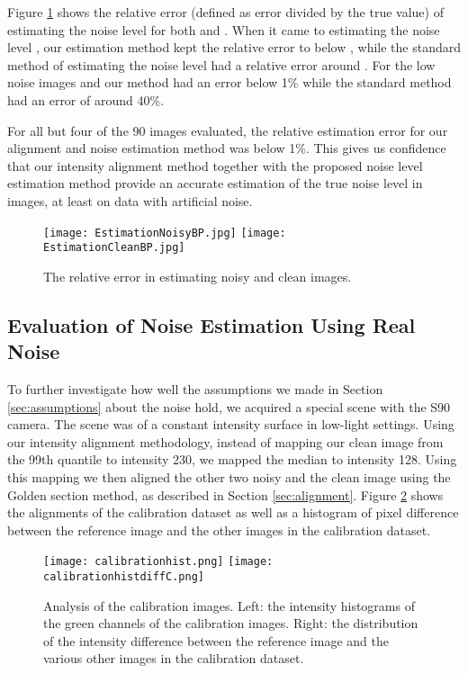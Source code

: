 \documentclass[review]{elsarticle}
\begin{document}
Figure \ref{fig:errorbp} shows the relative error (defined as error divided by the true value) of estimating the noise level for both  and  . When it came to estimating the noise level , our estimation method kept the relative error to below , while the standard method of estimating the noise level had a relative error around . For the low noise images  and  our method had an error below 1\% while the standard method had an error of around 40\%.

For all but four of the 90 images evaluated, the relative estimation error for our alignment and noise estimation method was below 1\%. This gives us confidence that our intensity alignment method together with the proposed noise level estimation method provide an accurate estimation of the true noise level in images, at least on data with artificial noise.
\begin{figure}[t]
\vspace{-2mm}
\centering
\texttt{[image: EstimationNoisyBP.jpg]}
\texttt{[image: EstimationCleanBP.jpg]}
\vskip -3mm
\caption{The relative error in estimating noisy and clean images. }
\label{fig:errorbp}
\vspace{-4mm}
\end{figure}





\subsection{Evaluation of Noise Estimation Using Real Noise}

To further investigate how well the assumptions we made in Section \ref{sec:assumptions} about the noise hold, we acquired a special scene with the S90 camera. The scene was of a constant intensity surface in low-light settings. Using our intensity alignment methodology, instead of mapping our clean image from the 99th quantile to intensity 230, we mapped the median to intensity 128. Using this mapping we then aligned the other two noisy and the clean image using the Golden section method, as described in Section \ref{sec:alignment}. Figure \ref{fig:Calibration} shows the alignments of the calibration dataset as well as a histogram of pixel difference between the reference image and the other images in the calibration dataset.  
\begin{figure}[htb]
\vskip -4mm
\centering
\texttt{[image: calibrationhist.png]}
\texttt{[image: calibrationhistdiffC.png]}
\vskip -3mm
\caption{Analysis of the calibration images. Left: the intensity histograms of the green channels of the calibration images. Right: the distribution of the intensity difference between the reference image and the various other images in the calibration dataset. \label{fig:Calibration}}
\vspace{-4mm}
\end{figure}
\end{document}
